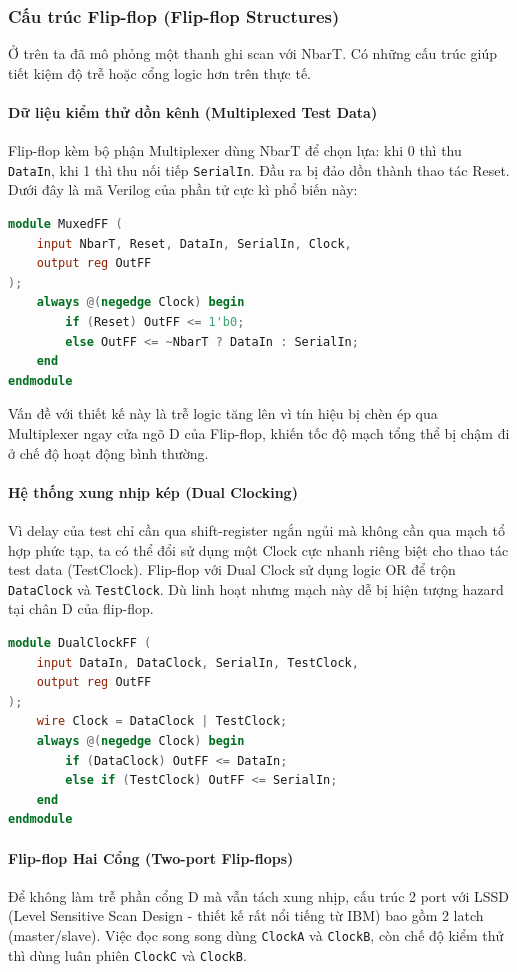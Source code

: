 \subsubsection{Cấu trúc Flip-flop (Flip-flop Structures)}
Ở trên ta đã mô phỏng một thanh ghi scan với NbarT. Có những cấu trúc giúp tiết kiệm độ trễ hoặc cổng logic hơn trên thực tế.
\paragraph{Dữ liệu kiểm thử dồn kênh (Multiplexed Test Data)}
Flip-flop kèm bộ phận Multiplexer dùng NbarT để chọn lựa: khi 0 thì thu \texttt{DataIn}, khi 1 thì thu nối tiếp \texttt{SerialIn}. Đầu ra bị đảo dồn thành thao tác Reset. Dưới đây là mã Verilog của phần tử cực kì phổ biến này:
\begin{lstlisting}[language=Verilog, caption={Cấu trúc Muxed Scan Flip-Flop}]
module MuxedFF (
    input NbarT, Reset, DataIn, SerialIn, Clock, 
    output reg OutFF
);
    always @(negedge Clock) begin
        if (Reset) OutFF <= 1'b0;
        else OutFF <= ~NbarT ? DataIn : SerialIn;
    end 
endmodule
\end{lstlisting}
Vấn đề với thiết kế này là trễ logic tăng lên vì tín hiệu bị chèn ép qua Multiplexer ngay cửa ngõ D của Flip-flop, khiến tốc độ mạch tổng thể bị chậm đi ở chế độ hoạt động bình thường.

\paragraph{Hệ thống xung nhịp kép (Dual Clocking)}
Vì delay của test chỉ cần qua shift-register ngắn ngủi mà không cần qua mạch tổ hợp phức tạp, ta có thể đổi sử dụng một Clock cực nhanh riêng biệt cho thao tác test data (TestClock). Flip-flop với Dual Clock sử dụng logic OR để trộn \texttt{DataClock} và \texttt{TestClock}. Dù linh hoạt nhưng mạch này dễ bị hiện tượng hazard tại chân D của flip-flop.
\begin{lstlisting}[language=Verilog, caption={Dual Clock Scan Flip-Flop}]
module DualClockFF (
    input DataIn, DataClock, SerialIn, TestClock, 
    output reg OutFF
);
    wire Clock = DataClock | TestClock;
    always @(negedge Clock) begin
        if (DataClock) OutFF <= DataIn;
        else if (TestClock) OutFF <= SerialIn;
    end
endmodule
\end{lstlisting}

\paragraph{Flip-flop Hai Cổng (Two-port Flip-flops)}
Để không làm trễ phần cổng D mà vẫn tách xung nhịp, cấu trúc 2 port với LSSD (Level Sensitive Scan Design - thiết kế rất nổi tiếng từ IBM) bao gồm 2 latch (master/slave). Việc đọc song song dùng \texttt{ClockA} và \texttt{ClockB}, còn chế độ kiểm thử thì dùng luân phiên \texttt{ClockC} và \texttt{ClockB}.

